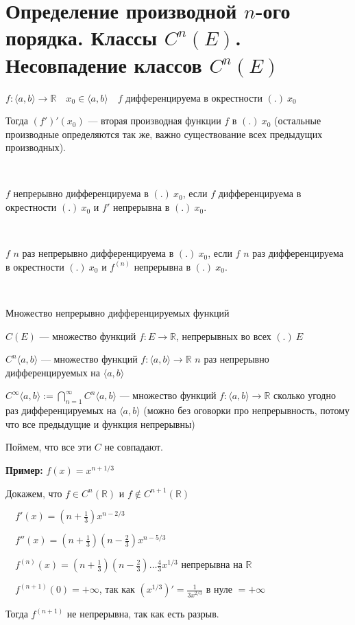 \section{Определение производной $n$-ого порядка. Классы $C^n(E)$. Несовпадение классов $C^n(E)$}

\begin{conj} 
    $f: \langle a, b \rangle \rightarrow \mathbb{R} \quad x_0 \in \langle a, b \rangle \quad f$ дифференцируема в окрестности $(.) \ x_0$

    Тогда $(f')'(x_0)$ --- вторая производная функции $f$ в $(.) \ x_0$ (остальные производные определяются так же, важно существование всех предыдущих производных).
\end{conj}
\
\begin{conj}
    $f$ непрерывно дифференцируема в $(.) \ x_0$, если $f$ дифференцируема в окрестности $(.) \ x_0$ и $f'$ непрерывна в $(.) \ x_0$.
\end{conj}
\
\begin{conj}
    $f$ $n$ раз непрерывно дифференцируема в $(.) \ x_0$, если $f$ $n$ раз дифференцируема в окрестности $(.) \ x_0$ и $f^{(n)}$ непрерывна в $(.) \ x_0$.
\end{conj}
\
\begin{conj}
    Множество непрерывно дифференцируемых функций

    $C(E)$ --- множество функций $f: E \rightarrow \mathbb{R}$, непрерывных во всех $(.) \ E$

    $C^n \langle a, b \rangle$ --- множество функций $f: \langle a, b \rangle \rightarrow \mathbb{R}$ $n$ раз непрерывно дифференцируемых на $\langle a, b \rangle$

    $C^\infty \langle a, b \rangle := \bigcap\limits_{n=1}^{\infty} C^n \langle a, b \rangle$ --- множество функций $f: \langle a, b \rangle \rightarrow \mathbb{R}$ сколько угодно раз дифференцируемых на $\langle a, b \rangle$ (можно без оговорки про непрерывность, потому что все предыдущие и функция непрерывны)
\end{conj}

Поймем, что все эти $C$ не совпадают.
\par\medskip
\textbf{Пример:} $f(x) = x^{n+1/3}$

Докажем, что $f \in C^n(\mathbb{R})$ и $f \notin C^{n+1}(\mathbb{R})$

$\quad f'(x) = (n + \frac{1}{3})x^{n-2/3}$

$\quad f''(x) = (n + \frac{1}{3})(n - \frac{2}{3})x^{n-5/3}$

$\quad f^{(n)}(x) = (n + \frac{1}{3})(n - \frac{2}{3}) \dots \frac{4}{3} x^{1/3}$ непрерывна на $\mathbb{R}$

$\quad f^{(n+1)}(0) = +\infty $, так как $(x^{1/3})' = \frac{1}{3x^{2/3}}$ в нуле $= +\infty$

Тогда $f^{(n+1)}$ не непрерывна, так как есть разрыв.


